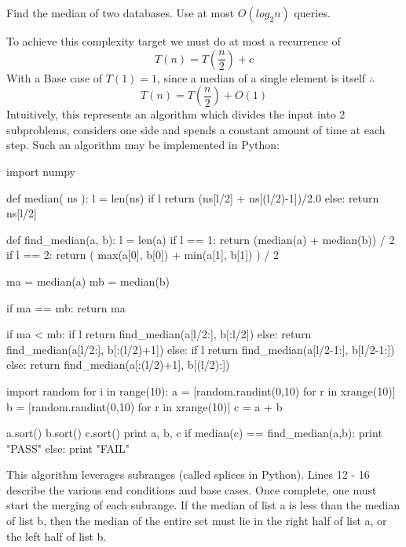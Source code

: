 \documentclass[12pt]{article}
\newenvironment{problem}[2][Problem]{\begin{trivlist}
\item[\hskip \labelsep {\bfseries #1}\hskip \labelsep {\bfseries #2.}]}{\end{trivlist}}
\begin{document}
\begin{problem}{5.1}
    Find the median of two databases. Use at most $O(log_2{n})$ queries.

    To achieve this complexity target we must do at most a recurrence of 
    \begin{equation}
        T(n) = T(\frac{n}{2}) + c
    \end{equation}
    With a Base case of $T(1) = 1$, since a median of a single element is
    itself $\therefore$
    \begin{equation}
        T(n) = T( \frac{n}{2}) + O(1)
    \end{equation}
     Intuitively, this represents an algorithm which divides the input into
     2 subproblems, considers one side and spends a constant amount of time at
       each step.
    Such an algorithm may be implemented in Python:
    \begin{python}
import numpy

def median( ns ):
    l = len(ns)
    if l %
        return (ns[l/2] + ns[(l/2)-1])/2.0
    else:
        return ns[l/2]


def find_median(a, b):
    l = len(a)
    if l == 1:
        return (median(a) + median(b)) / 2
    if l == 2:
        return ( max(a[0], b[0]) + min(a[1], b[1]) ) / 2

    ma = median(a)
    mb = median(b)

    if ma == mb:
        return ma
    
    if ma < mb:
        if l %
            return find_median(a[l/2:], b[:l/2])
        else:
            return find_median(a[l/2:], b[:(l/2)+1])
    else:
        if l %
            return find_median(a[l/2-1:], b[l/2-1:])
        else:
            return find_median(a[:(l/2)+1], b[(l/2):])

import random
for i in range(10):
    a = [random.randint(0,10) for r in xrange(10)]
    b = [random.randint(0,10) for r in xrange(10)]
    c = a + b

    a.sort()
    b.sort()
    c.sort()
    print a, b, c
    if median(c) == find_median(a,b):
        print "PASS"
    else:
        print "FAIL"
    \end{python}
This algorithm leverages subranges (called splices in Python).  Lines 12 - 16
describe the various end conditions and base cases.  Once complete, one must
start the merging of each subrange. If the median of list a is less than the
median of list b, then the median of the entire set must lie in the right half
of list a, or the left half of list b.


\end{problem}
\end{document}
